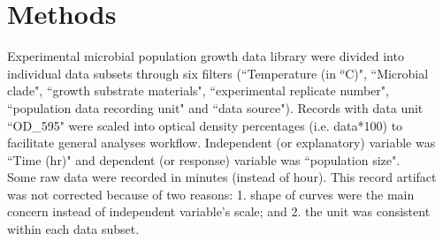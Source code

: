 \documentclass[a4paper, 11pt]{article}
\newcommand{\pop}{population size}
\begin{document}
	\section*{Methods}
	Experimental microbial population growth data library were divided into individual data subsets through six filters (``Temperature (in $^o$C)", ``Microbial clade", ``growth substrate materials", ``experimental replicate number", ``population data recording unit" and ``data source").  Records with data unit ``OD\_595" were scaled into optical density percentages (i.e. data*100) to facilitate general analyses workflow.  Independent (or explanatory) variable was ``Time (hr)" and dependent (or response) variable was ``\pop".\\
	Some raw data were recorded in minutes (instead of hour).  This record artifact was not corrected because of two reasons: 1. shape of curves were the main concern instead of independent variable's scale; and 2. the unit was consistent within each data subset.
	
\end{document}
